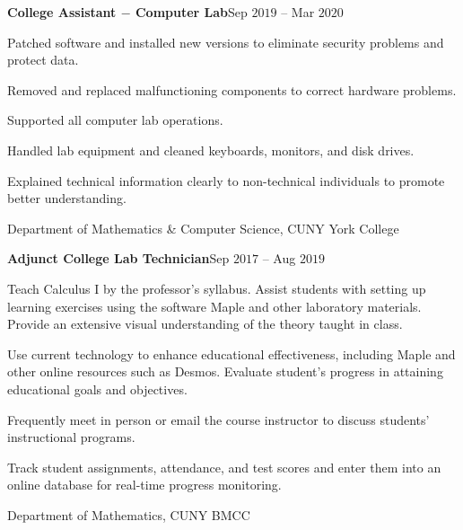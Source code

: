 \documentclass[a4paper, 12pt]{article}
\begin{document}
\begin{flushleft}
\begin{flushleft}
\textbf{College Assistant $-$ Computer Lab}\hfill Sep $2019$ -- Mar $2020$\\
\begin{compactitem}
    \item Patched software and installed new versions to eliminate security problems and protect data.
    \item Removed and replaced malfunctioning components to correct hardware problems.
    \item Supported all computer lab operations.
    \item Handled lab equipment and cleaned keyboards, monitors, and disk drives.
    \item Explained technical information clearly to non-technical individuals to promote better understanding.
\end{compactitem}
Department of Mathematics \& Computer Science, CUNY York College
\end{flushleft}

\begin{flushleft}
\textbf{Adjunct College Lab Technician}\hfill Sep $2017$ -- Aug $2019$\\
\begin{compactitem}
    \item Teach Calculus I by the professor's syllabus. Assist students with setting up learning exercises using the software Maple and other laboratory materials. Provide an extensive visual understanding of the theory taught in class.
    \item Use current technology to enhance educational eﬀectiveness, including Maple and other online resources such as Desmos. Evaluate student's progress in attaining educational goals and objectives.
    \item Frequently meet in person or email the course instructor to discuss students' instructional programs.
    \item Track student assignments, attendance, and test scores and enter them into an online database for real-time progress monitoring.
\end{compactitem}
Department of Mathematics, CUNY BMCC
\end{flushleft}


\end{flushleft}
\end{document}
